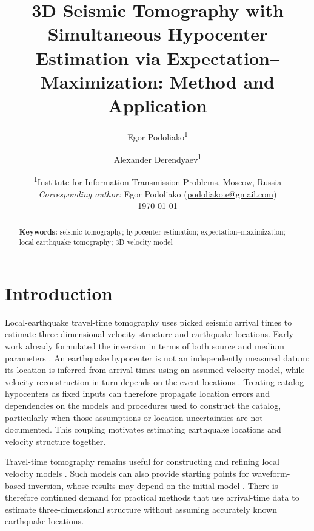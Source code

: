 \documentclass[12pt, a4paper]{article}
\title{
  \Large\textbf{
    3D Seismic Tomography with Simultaneous Hypocenter Estimation
    via Expectation--Maximization: Method and Application
  }
}
\author{
  Egor Podoliako\textsuperscript{1} \and
  Alexander Derendyaev\textsuperscript{1}
}
\date{
  \small
  \textsuperscript{1}Institute for Information Transmission Problems, Moscow, Russia \\
  \textit{Corresponding author:} Egor Podoliako
  (\href{mailto:podoliako.e@gmail.com}{podoliako.e@gmail.com}) \\[6pt]
  \today
}
\begin{document}
\maketitle
\thispagestyle{empty}

\begin{abstract}
  \noindent

  \vspace{6pt}
  \noindent\textbf{Keywords:} seismic tomography; hypocenter estimation;
  expectation--maximization; local earthquake tomography; 3D velocity model
\end{abstract}

\newpage

\section{Introduction}
\label{sec:introduction}

Local-earthquake travel-time tomography uses picked seismic arrival times to estimate three-dimensional velocity structure and earthquake locations. Early work already formulated the inversion in terms of both source and medium parameters \parencite{aki1976}. An earthquake hypocenter is not an independently measured datum: its location is inferred from arrival times using an assumed velocity model, while velocity reconstruction in turn depends on the event locations \parencite{thurber1992,kissling1988}. Treating catalog hypocenters as fixed inputs can therefore propagate location errors and dependencies on the models and procedures used to construct the catalog, particularly when those assumptions or location uncertainties are not documented. This coupling motivates estimating earthquake locations and velocity structure together.

Travel-time tomography remains useful for constructing and refining local velocity models \parencite{fichtner2024seismic}. Such models can also provide starting points for waveform-based inversion, whose results may depend on the initial model \parencite{virieux2009}. There is therefore continued demand for practical methods that use arrival-time data to estimate three-dimensional structure without assuming accurately known earthquake locations.
\end{document}
